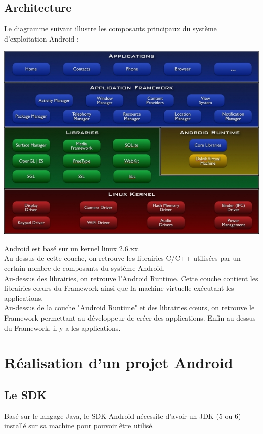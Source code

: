 \documentclass[a4paper]{report}
\begin{document}
		\subsection{Architecture}
			Le diagramme suivant illustre les composants principaux du système d’exploitation Android :\\
			\begin{center}
				\includegraphics[scale=0.5]{Images/architecture-systeme-android.jpg}
			\end{center}
			Android est basé sur un kernel linux 2.6.xx.\\
			Au-dessus de cette couche, on retrouve les librairies C/C++ utilisées par un certain nombre de
			composants du système Android.\\
			Au-dessus des librairies, on retrouve l'Android Runtime. Cette couche contient les librairies cœurs
			du Framework ainsi que la machine virtuelle exécutant les applications.\\
			Au-dessus de la couche "Android Runtime" et des librairies cœurs, on retrouve le Framework
			permettant au développeur de créer des applications. Enfin au-dessus du Framework, il y a les
			applications.\\
	
	\section{Réalisation d’un projet Android}
		\subsection{Le SDK}
			Basé sur le langage Java, le SDK Android nécessite d'avoir un JDK (5 ou 6) installé sur sa machine pour pouvoir être utilisé.\\
\end{document}
